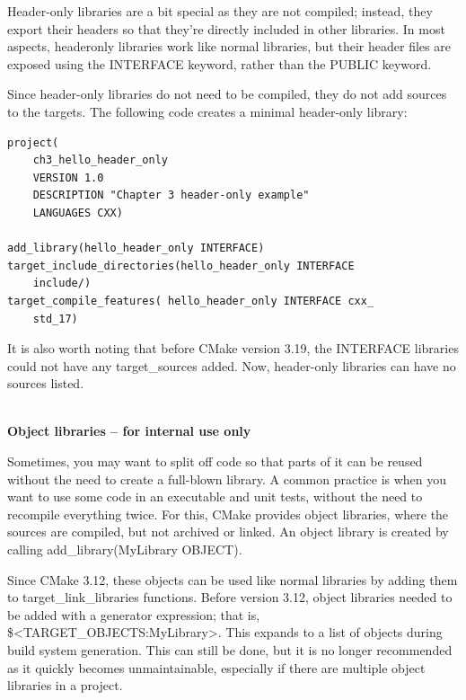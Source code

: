 
Header-only libraries are a bit special as they are not compiled; instead, they export their headers so that they're directly included in other libraries. In most aspects, headeronly libraries work like normal libraries, but their header files are exposed using the INTERFACE keyword, rather than the PUBLIC keyword.

Since header-only libraries do not need to be compiled, they do not add sources to the targets. The following code creates a minimal header-only library:

\begin{lstlisting}[style=styleCMake]
project(
	ch3_hello_header_only
	VERSION 1.0
	DESCRIPTION "Chapter 3 header-only example"
	LANGUAGES CXX)

add_library(hello_header_only INTERFACE)
target_include_directories(hello_header_only INTERFACE
	include/)
target_compile_features( hello_header_only INTERFACE cxx_
	std_17)
\end{lstlisting}

It is also worth noting that before CMake version 3.19, the INTERFACE libraries could not have any target\_sources added. Now, header-only libraries can have no sources listed.

\hspace*{\fill} \\ %
\noindent
\textbf{Object libraries – for internal use only}

Sometimes, you may want to split off code so that parts of it can be reused without the need to create a full-blown library. A common practice is when you want to use some code in an executable and unit tests, without the need to recompile everything twice. For this, CMake provides object libraries, where the sources are compiled, but not archived or linked. An object library is created by calling add\_library(MyLibrary OBJECT).

Since CMake 3.12, these objects can be used like normal libraries by adding them to target\_link\_libraries functions. Before version 3.12, object libraries needed to be added with a generator expression; that is, \$<TARGET\_OBJECTS:MyLibrary>. This expands to a list of objects during build system generation. This can still be done, but it is no longer recommended as it quickly becomes unmaintainable, especially if there are multiple object libraries in a project.

